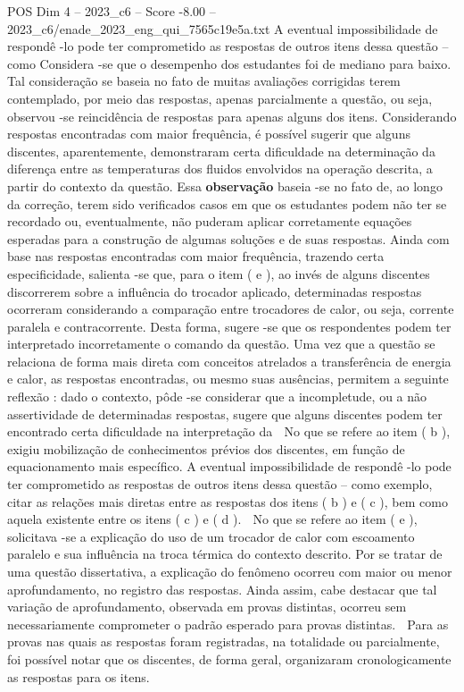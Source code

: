 \begin{textsample}{POS Dim 4 – 2023\_c6 – Score -8.00 – 2023\_c6/enade\_2023\_eng\_qui\_7565c19e5a.txt}
A eventual impossibilidade de respondê -lo pode ter comprometido as respostas de outros itens dessa questão – como Considera -se que o desempenho dos estudantes foi de mediano para baixo.
Tal consideração se baseia no fato de muitas avaliações corrigidas terem contemplado, por meio das respostas, apenas parcialmente a questão, ou seja, observou -se reincidência de respostas para apenas alguns dos itens.
Considerando respostas encontradas com maior frequência, é possível sugerir que alguns discentes, aparentemente, demonstraram certa dificuldade na determinação da diferença entre as temperaturas dos fluidos envolvidos na operação descrita, a partir do contexto da questão.
Essa \textbf{observação} baseia -se no fato de, ao longo da correção, terem sido verificados casos em que os estudantes podem não ter se recordado ou, eventualmente, não puderam aplicar corretamente equações esperadas para a construção de algumas soluções e de suas respostas.
Ainda com base nas respostas encontradas com maior frequência, trazendo certa especificidade, salienta -se que, para o item ( e ), ao invés de alguns discentes discorrerem sobre a influência do trocador aplicado, determinadas respostas ocorreram considerando a comparação entre trocadores de calor, ou seja, corrente paralela e contracorrente.
Desta forma, sugere -se que os respondentes podem ter interpretado incorretamente o comando da questão.
Uma vez que a questão se relaciona de forma mais direta com conceitos atrelados a transferência de energia e calor, as respostas encontradas, ou mesmo suas ausências, permitem a seguinte reflexão : dado o contexto, pôde -se considerar que a incompletude, ou a não assertividade de determinadas respostas, sugere que alguns discentes podem ter encontrado certa dificuldade na interpretação da  No que se refere ao item ( b ), exigiu mobilização de conhecimentos prévios dos discentes, em função de equacionamento mais específico.
A eventual impossibilidade de respondê -lo pode ter comprometido as respostas de outros itens dessa questão – como exemplo, citar as relações mais diretas entre as respostas dos itens ( b ) e ( c ), bem como aquela existente entre os itens ( c ) e ( d ).  No que se refere ao item ( e ), solicitava -se a explicação do uso de um trocador de calor com escoamento paralelo e sua influência na troca térmica do contexto descrito.
Por se tratar de uma questão dissertativa, a explicação do fenômeno ocorreu com maior ou menor aprofundamento, no registro das respostas.
Ainda assim, cabe destacar que tal variação de aprofundamento, observada em provas distintas, ocorreu sem necessariamente comprometer o padrão esperado para provas distintas.  Para as provas nas quais as respostas foram registradas, na totalidade ou parcialmente, foi possível notar que os discentes, de forma geral, organizaram cronologicamente as respostas para os itens.

\end{textsample}
